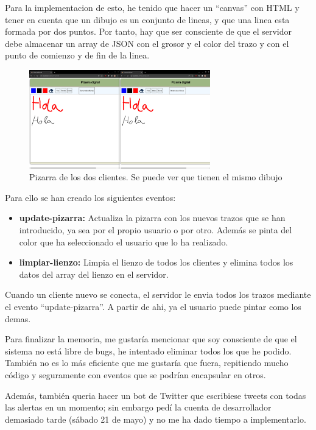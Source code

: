 \documentclass{article}
\begin{document}
Para la implementacion de esto, he tenido que hacer un ``canvas'' con HTML y tener en cuenta que un dibujo es un conjunto de lineas, y que una linea esta formada por dos puntos. Por tanto, hay que ser consciente de que el servidor debe almacenar un array de JSON con el grosor y el color del trazo y con el punto de comienzo y de fin de la linea.

\begin{figure}[H]
    \centering
    \includegraphics[width=0.7\textwidth]{images/pizarra.png}
    \caption{Pizarra de los dos clientes. Se puede ver que tienen el mismo dibujo}
\end{figure}


Para ello se han creado los siguientes eventos:

\begin{itemize}
    \item \textbf{update-pizarra: }Actualiza la pizarra con los nuevos trazos que se han introducido, ya sea por el propio usuario o por otro. Además se pinta del color que ha seleccionado el usuario que lo ha realizado.
    \item \textbf{limpiar-lienzo: }Limpia el lienzo de todos los clientes y elimina todos los datos del array del lienzo en el servidor.
\end{itemize}

Cuando un cliente nuevo se conecta, el servidor le envia todos los trazos mediante el evento ``update-pizarra''. A partir de ahi, ya el usuario puede pintar como los demas.


Para finalizar la memoria, me gustaría mencionar que soy consciente de que el sistema no está libre de bugs, he intentado eliminar todos los que he podido. También no es lo más eficiente que me gustaría que fuera, repitiendo mucho código y seguramente con eventos que se podrían encapsular en otros.

Además, también queria hacer un bot de Twitter que escribiese tweets con todas las alertas en un momento; sin embargo pedí la cuenta de desarrollador demasiado tarde (sábado 21 de mayo) y no me ha dado tiempo a implementarlo.
\end{document}
